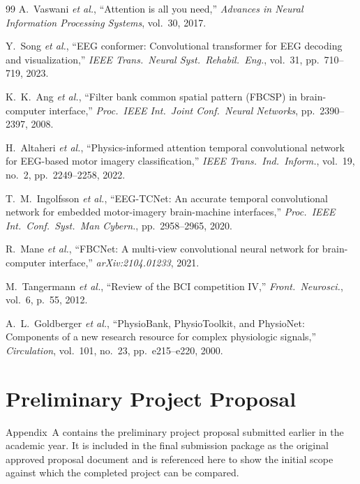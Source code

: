 \documentclass[12pt, a4paper]{article}
\begin{document}
\begin{thebibliography}{99}
A.~Vaswani \emph{et al.}, ``Attention is all you need,'' \textit{Advances in Neural Information Processing Systems}, vol.~30, 2017.

Y.~Song \emph{et al.}, ``EEG conformer: Convolutional transformer for EEG decoding and visualization,'' \textit{IEEE Trans.\ Neural Syst.\ Rehabil.\ Eng.}, vol.~31, pp.~710--719, 2023.

K.~K.~Ang \emph{et al.}, ``Filter bank common spatial pattern (FBCSP) in brain-computer interface,'' \textit{Proc.\ IEEE Int.\ Joint Conf.\ Neural Networks}, pp.~2390--2397, 2008.

H.~Altaheri \emph{et al.}, ``Physics-informed attention temporal convolutional network for EEG-based motor imagery classification,'' \textit{IEEE Trans.\ Ind.\ Inform.}, vol.~19, no.~2, pp.~2249--2258, 2022.

T.~M.~Ingolfsson \emph{et al.}, ``EEG-TCNet: An accurate temporal convolutional network for embedded motor-imagery brain-machine interfaces,'' \textit{Proc.\ IEEE Int.\ Conf.\ Syst.\ Man Cybern.}, pp.~2958--2965, 2020.

R.~Mane \emph{et al.}, ``FBCNet: A multi-view convolutional neural network for brain-computer interface,'' \textit{arXiv:2104.01233}, 2021.

M.~Tangermann \emph{et al.}, ``Review of the BCI competition IV,'' \textit{Front.\ Neurosci.}, vol.~6, p.~55, 2012.

A.~L.~Goldberger \emph{et al.}, ``PhysioBank, PhysioToolkit, and PhysioNet: Components of a new research resource for complex physiologic signals,'' \textit{Circulation}, vol.~101, no.~23, pp.~e215--e220, 2000.
\end{thebibliography}

\clearpage
\appendix

\section{Preliminary Project Proposal}

Appendix~A contains the preliminary project proposal submitted earlier in the academic year. It is included in the final submission package as the original approved proposal document and is referenced here to show the initial scope against which the completed project can be compared.
\end{document}
